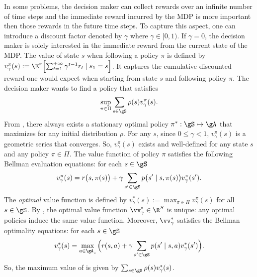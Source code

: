 In some problems, the decision maker can collect rewards over an infinite number of time steps and the immediate reward incurred by the MDP is more important then those rewards in the future time steps.
To capture this aspect, one can introduce a discount factor denoted by $\gamma$ where $\gamma\in[0,1)$.
If $\gamma=0$, the decision maker is solely interested in the immediate reward from the current state of the MDP.
The value of state $s$ when following a policy $\pi$ is defined by $v^\pi_{\gamma}(s):=\E^\pi\Bigl[\sum_{t=1}^{+\infty} \gamma^{t-1}r_t \mid s_1=s\Bigr]$.
It captures the cumulative discounted reward one would expect when starting from state $s$ and following policy $\pi$.
The decision maker wants to find a policy that satisfies
\begin{equation}
    \label{eq:discount_obj}
    \sup_{\pi\in\Pi}\sum_{s\in\gS}\rho(s)v^\pi_{\gamma}(s).
\end{equation}
From \cite[Chapter~6]{puterman2014markov}, there always exists a stationary optimal policy $\pi^*:\gS\mapsto\gA$ that maximizes  for any initial distribution $\rho$.
For any $s$, since $0\le\gamma<1$, $v_\gamma^\pi(s)$ is a geometric series that converges.
So, $v^\pi_\gamma(s)$ exists and well-defined for any state $s$ and any policy $\pi\in\Pi$.
The value function of policy $\pi$ satisfies the following Bellman evaluation equations: for each $s\in\gS$
\begin{equation}
    \label{eq:discount_be_eval}
    v^\pi_\gamma(s) =r\bigl(s,\pi(s)\bigr) +\gamma\sum_{s'\in\gS}p\bigl(s'\mid s,\pi(s)\bigr)v^\pi_\gamma(s').
\end{equation}
The \emph{optimal} value function is defined by $v^*_\gamma(s):=\max_{\pi\in\Pi}v^\pi_\gamma(s)$ for all $s\in\gS$.
By \cite[Theorem~6.2.5]{puterman2014markov}, the optimal value function $\vv^*_\gamma\in\R^{S}$ is unique: any optimal policies induce the same value function.
Moreover, $\vv^*_\gamma$ satisfies the Bellman optimality equations: for each $s\in\gS$
\begin{equation}
    \label{eq:discount_be_opt}
     v^*_\gamma(s)= \max_{a\in\gA_s}\Big(r(s, a) +\gamma\sum_{s'\in\gS}p(s'\mid s,a)v^*_\gamma(s')\Big).
\end{equation}
So, the maximum value of  is given by $\sum_{s\in\gS}\rho(s)v^*_\gamma(s)$.


